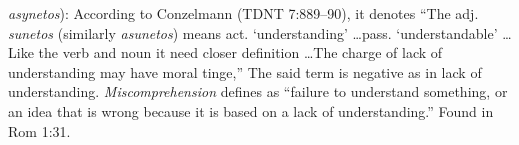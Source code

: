 \item[Miscomprehension,]

\textit{asynetos}):
According to Conzelmann (TDNT 7:889--90), it denotes ``The adj. \emph{sunetos} (similarly \emph{asunetos}) means act. `understanding' \ldots pass. `understandable' \ldots Like the verb and noun it need closer definition \ldots The charge of lack of understanding may have moral tinge,'' The said term is negative as in lack of understanding. \emph{Miscomprehension} defines as ``failure to understand something, or an idea that is wrong because it is based on a lack of understanding.''
Found in Rom 1:31.
